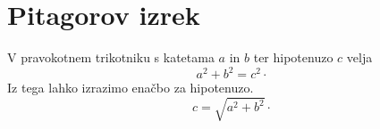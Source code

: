 \documentclass{article}
\begin{document}
\section*{Pitagorov izrek}
V pravokotnem trikotniku s katetama \(a\) in \(b\) ter hipotenuzo \(c\) velja
\[ a^2 + b^2 = c^2 \cdot\]
Iz tega lahko izrazimo enačbo za hipotenuzo.
\[c = \sqrt{a^2 + b^2}\cdot\]
\end{document}
